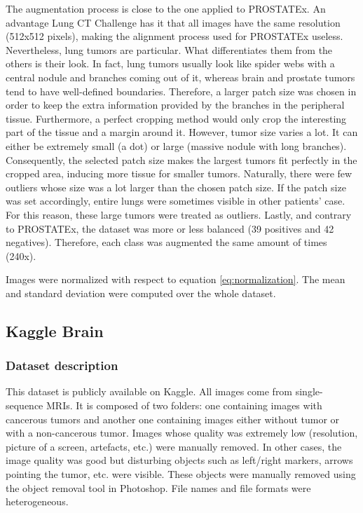 The augmentation process is close to the one applied to PROSTATEx. An advantage Lung CT Challenge has it that all images have the same resolution (512x512 pixels), making the alignment process used for PROSTATEx useless. Nevertheless, lung tumors are particular. What differentiates them from the others is their look. In fact, lung tumors usually look like spider webs with a central nodule and branches coming out of it, whereas brain and prostate tumors tend to have well-defined boundaries. Therefore, a larger patch size was chosen in order to keep the extra information provided by the branches in the peripheral tissue. Furthermore, a perfect cropping method would only crop the interesting part of the tissue and a margin around it. However, tumor size varies a lot. It can either be extremely small (a dot) or large (massive nodule with long branches). Consequently, the selected patch size makes the largest tumors fit perfectly in the cropped area, inducing more tissue for smaller tumors. Naturally, there were few outliers whose size was a lot larger than the chosen patch size. If the patch size was set accordingly, entire lungs were sometimes visible in other patients' case. For this reason, these large tumors were treated as outliers. Lastly, and contrary to PROSTATEx, the dataset was more or less balanced (39 positives and 42 negatives). Therefore, each class was augmented the same amount of times (240x). 

Images were normalized with respect to equation \ref{eq:normalization}. The mean and standard deviation were computed over the whole dataset. 


\subsection{Kaggle Brain}
\label{sec:kaggleBrain}
\subsubsection{Dataset description}
This dataset is publicly available on Kaggle. All images come from single-sequence MRIs. It is composed of two folders: one containing images with cancerous tumors and another one containing images either without tumor or with a non-cancerous tumor. Images whose quality was extremely low (resolution, picture of a screen, artefacts, etc.) were manually removed. In other cases, the image quality was good but disturbing objects such as left/right markers, arrows pointing the tumor, etc. were visible. These objects were manually removed using the object removal tool in Photoshop. File names and file formats were heterogeneous.


